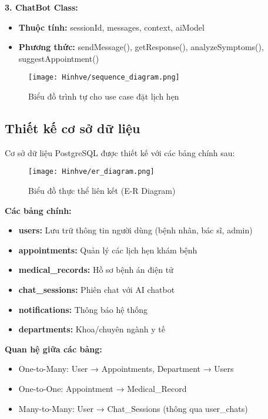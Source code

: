 \documentclass[../DoAn.tex]{subfiles}
\begin{document}
\textbf{3. ChatBot Class:}
\begin{itemize}
    \item \textbf{Thuộc tính:} sessionId, messages, context, aiModel
    \item \textbf{Phương thức:} sendMessage(), getResponse(), analyzeSymptoms(), suggestAppointment()
\end{itemize}

\begin{figure}[H]
    \centering
    \texttt{[image: Hinhve/sequence\_diagram.png]}
    \caption{Biểu đồ trình tự cho use case đặt lịch hẹn}
    \label{fig:sequence_appointment}
\end{figure}

\subsection{Thiết kế cơ sở dữ liệu}

Cơ sở dữ liệu PostgreSQL được thiết kế với các bảng chính sau:

\begin{figure}[H]
    \centering
    \texttt{[image: Hinhve/er\_diagram.png]}
    \caption{Biểu đồ thực thể liên kết (E-R Diagram)}
    \label{fig:er_diagram}
\end{figure}

\textbf{Các bảng chính:}
\begin{itemize}
    \item \textbf{users:} Lưu trữ thông tin người dùng (bệnh nhân, bác sĩ, admin)
    \item \textbf{appointments:} Quản lý các lịch hẹn khám bệnh
    \item \textbf{medical\_records:} Hồ sơ bệnh án điện tử
    \item \textbf{chat\_sessions:} Phiên chat với AI chatbot
    \item \textbf{notifications:} Thông báo hệ thống
    \item \textbf{departments:} Khoa/chuyên ngành y tế
\end{itemize}

\textbf{Quan hệ giữa các bảng:}
\begin{itemize}
    \item One-to-Many: User → Appointments, Department → Users
    \item One-to-One: Appointment → Medical\_Record
    \item Many-to-Many: User → Chat\_Sessions (thông qua user\_chats)
\end{itemize}
\end{document}
